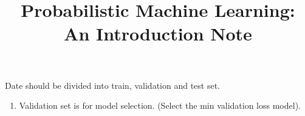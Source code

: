 \documentclass[12pt]{article}
\title{Probabilistic Machine Learning: An Introduction Note}
\begin{document}
	\maketitle
	Date should be divided into train, validation and test set. 
	\begin{enumerate}
		\item Validation set is for model selection. (Select the min validation loss model).
	\end{enumerate}
\end{document}

